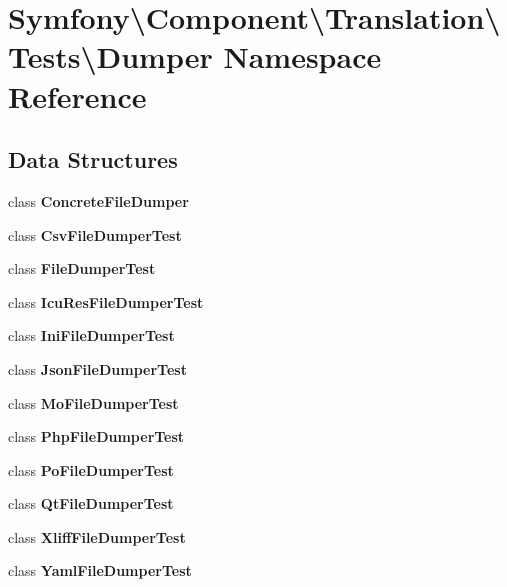 \section{Symfony\textbackslash{}Component\textbackslash{}Translation\textbackslash{}Tests\textbackslash{}Dumper Namespace Reference}
\label{namespace_symfony_1_1_component_1_1_translation_1_1_tests_1_1_dumper}
\subsection*{Data Structures}
\begin{DoxyCompactItemize}
\item 
class {\bf Concrete\+File\+Dumper}
\item 
class {\bf Csv\+File\+Dumper\+Test}
\item 
class {\bf File\+Dumper\+Test}
\item 
class {\bf Icu\+Res\+File\+Dumper\+Test}
\item 
class {\bf Ini\+File\+Dumper\+Test}
\item 
class {\bf Json\+File\+Dumper\+Test}
\item 
class {\bf Mo\+File\+Dumper\+Test}
\item 
class {\bf Php\+File\+Dumper\+Test}
\item 
class {\bf Po\+File\+Dumper\+Test}
\item 
class {\bf Qt\+File\+Dumper\+Test}
\item 
class {\bf Xliff\+File\+Dumper\+Test}
\item 
class {\bf Yaml\+File\+Dumper\+Test}
\end{DoxyCompactItemize}
